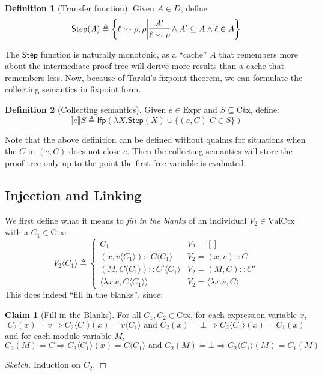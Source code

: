 \documentclass{article}
\theoremstyle{definition}
\newtheorem{definition}{Definition}[section]
\newtheorem{clm}{Claim}[section]
\newcommand*{\cons}{::}
\newcommand*{\Expr}{\text{Expr}}
\newcommand*{\Ctx}{\text{Ctx}}
\newcommand*{\Value}{\text{Val}}
\newcommand*{\lfp}{\mathsf{lfp}}
\newcommand*{\semarrow}{\rightsquigarrow}
\newcommand*{\sembracket}[1]{\lBrack{#1}\rBrack}
\newcommand*{\inject}[2]{{#2}\langle{#1}\rangle}
\begin{document}
\begin{definition}[Transfer function]
  Given $A\in D$, define
  \[
    \mathsf{Step}(A)\triangleq
    \left\{\ell\semarrow\rho, \rho\middle|
    \begin{prooftree}[center=true]
      \hypo{A'}\infer1{\ell\semarrow\rho}
    \end{prooftree}\wedge
    A'\subseteq A\wedge\ell\in A
    \right\}
  \]
\end{definition}

The $\mathsf{Step}$ function is naturally monotonic, as a ``cache'' $A$ that remembers more about the intermediate proof tree will derive more results than a cache that remembers less.
Now, because of Tarski's fixpoint theorem, we can formulate the collecting semantics in fixpoint form.
\begin{definition}[Collecting semantics]
  Given $e\in\Expr$ and $S\subseteq\Ctx$, define:
  \[
    \sembracket{e}S\triangleq\lfp(\lambda X.\mathsf{Step}(X)\cup\{(e,C)|C\in S\})
  \]
\end{definition}
Note that the above definition can be defined without qualms for situations when the $C$ in $(e,C)$ does not close $e$.
Then the collecting semantics will store the proof tree only up to the point the first free variable is evaluated.

\subsection{Injection and Linking}
We first define what it means to \emph{fill in the blanks} of an individual $V_2\in\Value\Ctx$ with a $C_1\in\Ctx$:
\[
  \inject{C_{1}}{V_{2}}\triangleq
  \begin{cases}
    C_1                                           & V_{2}=[]                        \\
    (x, \inject{C_1}{v})\cons\inject{C_{1}}{C}    & V_{2}=(x,v)\cons C              \\
    (M, \inject{C_{1}}{C})\cons\inject{C_{1}}{C'} & V_{2}=(M,C)\cons C'             \\
    \langle\lambda x.e,\inject{C_1}{C}\rangle     & V_2=\langle\lambda x.e,C\rangle
  \end{cases}
\]
This does indeed ``fill in the blanks'', since:
\begin{clm}[Fill in the Blanks]
  For all $C_1,C_2\in\Ctx$, for each expression variable $x$,
  \[
    C_2(x)=v\Rightarrow\inject{C_1}{C_2}(x)=\inject{C_1}{v}\text{ and }C_2(x)=\bot\Rightarrow\inject{C_1}{C_2}(x)=C_1(x)
  \]
  and for each module variable $M$,
  \[
    C_2(M)=C\Rightarrow\inject{C_1}{C_2}(x)=\inject{C_1}{C}\text{ and }C_2(M)=\bot\Rightarrow\inject{C_1}{C_2}(M)=C_1(M)
  \]
\end{clm}
\begin{proof}[Sketch]
  Induction on $C_2$.
\end{proof}
\end{document}
